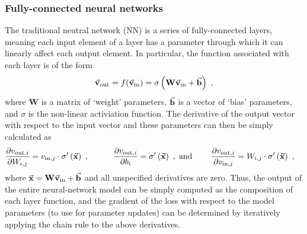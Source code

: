 \subsubsection{Fully-connected neural networks}
The traditional neutral network (NN) is a series of fully-connected layers, meaning each input element of a layer has a parameter through which it can linearly affect each output element.
In particular, the function associated with each layer is of the form \textcolor{blue}{\autocite{Nielsen_2015}}
\begin{equation*}
  \begin{aligned}
    \vec{\mathbf{v}}_{\text{out}} = f(\vec{\mathbf{v}}_{\text{in}}) = \sigma\left(\mathbf{W}\vec{\mathbf{v}}_{\text{in}} + \vec{\mathbf{b}}\right) ~,
  \end{aligned}
\end{equation*}
where $\mathbf{W}$ is a matrix of `weight' parameters, $\vec{\mathbf{b}}$ is a vector of `bias' parameters, and $\sigma$ is the non-linear activiation function.
The derivative of the output vector with respect to the input vector and these parameters can then be simply calculated as
\begin{equation*}
  \begin{aligned}
    \frac{\partial v_{\text{out}, i}}{\partial W_{i, j}} = v_{\text{in}, j} \cdot \sigma'\left(\vec{\mathbf{x}}\right)\hspace{3pt}, \hspace{30pt} \frac{\partial v_{\text{out}, i}}{\partial b_{i}} & = \sigma'\left(\vec{\mathbf{x}}\right)\hspace{3pt},\text{ and} \hspace{23pt} \frac{\partial v_{\text{out}, i}}{\partial v_{\text{in}, j}} = W_{i, j} \cdot \sigma'\left(\vec{\mathbf{x}}\right) ~,
  \end{aligned}
\end{equation*}
where $\vec{\mathbf{x}} = \mathbf{W}\vec{\mathbf{v}}_{\text{in}} + \vec{\mathbf{b}}$ and all unspecified derivatives are zero.
Thus, the output of the entire neural-network model can be simply computed as the composition of each layer function, and the gradient of the loss with respect to the model parameters (to use for parameter updates) can be determined by iteratively applying the chain rule to the above derivatives.

